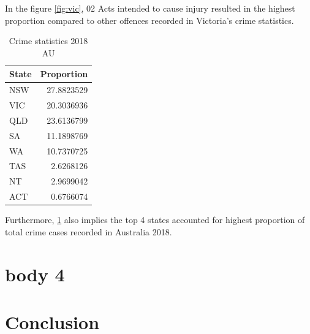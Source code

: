 \documentclass[11pt,a4paper,]{article}
\begin{document}
In the figure \ref{fig:vic}, 02 Acts intended to cause injury resulted in the highest proportion compared to other offences recorded in Victoria's crime statistics.

\begin{table}

\caption{\label{tab:table}Crime statistics 2018 AU}
\centering
\begin{tabular}[t]{l|r}
\hline
State & Proportion\\
\hline
NSW & 27.8823529\\
\hline
VIC & 20.3036936\\
\hline
QLD & 23.6136799\\
\hline
SA & 11.1898769\\
\hline
WA & 10.7370725\\
\hline
TAS & 2.6268126\\
\hline
NT & 2.9699042\\
\hline
ACT & 0.6766074\\
\hline
\end{tabular}
\end{table}

Furthermore, \ref{tab:table} also implies the top 4 states accounted for highest proportion of total crime cases recorded in Australia 2018.

\section*{body 4}

\hypertarget{conclusion}{%
\section{Conclusion}\label{conclusion}}
\end{document}
